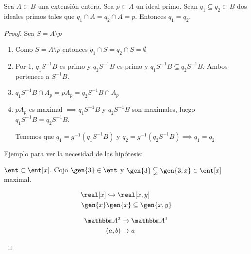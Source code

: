 \begin{prop}
	Sea $A \subset B$ una extensión entera. Sea $p \subset A$ un ideal primo. Sean $q_1 \subseteq q_2 \subset B$ dos ideales primos tales que $q_1 \cap A=q_2 \cap A = p$. Entonces $q_1=q_2$.
\end{prop}

\begin{proof}
	Sea $S = A \setminus p$
	
	
	\begin{enumerate}
		\item 	Como $S= A \setminus p$ entonces $q_1 \cap S = q_2 \cap S = \emptyset$
		\item Por 1, $q_1S^{-1}B$ es primo y $q_2S^{-1}B$ es primo y $q_1S^{-1}B  \subseteq q_2S^{-1}B$. Ambos pertenece a $S^{-1}B$.
		
		\item $q_1S^{-1}B \cap A_p=pA_p=q_2S^{-1}B \cap A_p$
		\item $pA_p$ es maximal $\implies q_1S^{-1}B$ y $q_2S^{-1}B$ son maximales, luego $q_1S^{-1}B = q_2S^{-1}B$.
		
		Tenemos que $q_1=g^{-1}(q_1S^{-1}B)$ y $q_2=g^{-1}(q_2S^{-1}B) \implies q_1 = q_2$ 
	\end{enumerate}
	
	Ejemplo para ver la necesidad de las hipótesis:
	
	\begin{example}
		$\ent \subset \ent[x]$. Cojo $\gen{3} \in \ent$ y $\gen{3} \subsetneqq \gen{3,x} \in \ent[x]$ maximal. 
	\end{example}
	
	\begin{example}
		\begin{align*}
			\real[x] & \hookrightarrow \real[x,y] \\
			\gen{x} & \gen{x} \subseteq \gen{x,y}
		\end{align*}
		
		\begin{align*}
			\A^2 & \rightarrow \A^1 \\
			(a,b)& \rightarrow a
		\end{align*}
		
	\end{example}
	
\end{proof}

